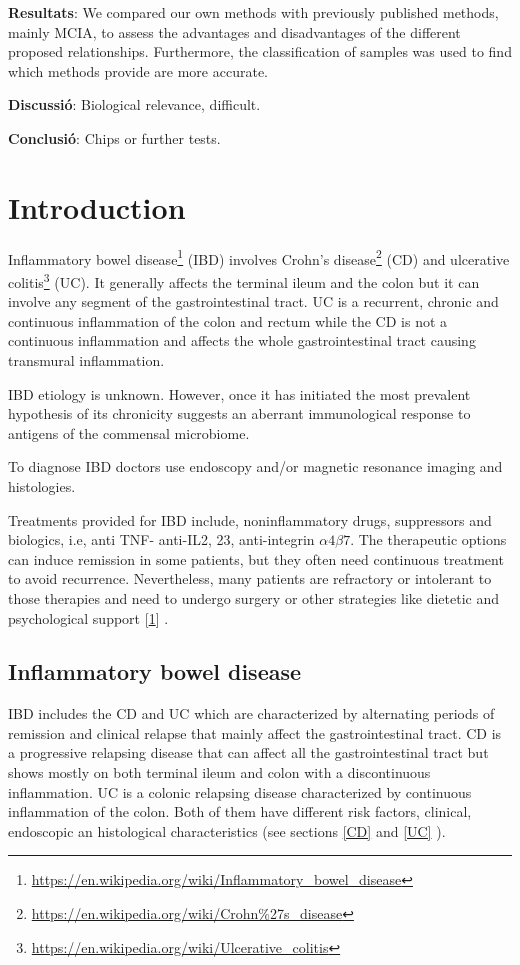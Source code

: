 \documentclass[
  a4paper,
]{book}
\DeclareRobustCommand{\href}[2]{#2\footnote{\url{#1}}}
\begin{document}
\textbf{Resultats}: We compared our own methods with previously published methods, mainly MCIA, to assess the advantages and disadvantages of the different proposed relationships.
Furthermore, the classification of samples was used to find which methods provide are more accurate.

\textbf{Discussió}: Biological relevance, difficult.

\textbf{Conclusió}: Chips or further tests.

\hypertarget{introduction}{%
\chapter{Introduction}\label{introduction}}

\href{https://en.wikipedia.org/wiki/Inflammatory_bowel_disease}{Inflammatory bowel disease} (IBD) involves \href{https://en.wikipedia.org/wiki/Crohn\%27s_disease}{Crohn's disease} (CD) and \href{https://en.wikipedia.org/wiki/Ulcerative_colitis}{ulcerative colitis} (UC).
It generally affects the terminal ileum and the colon but it can involve any segment of the gastrointestinal tract.
UC is a recurrent, chronic and continuous inflammation of the colon and rectum while the CD is not a continuous inflammation and affects the whole gastrointestinal tract causing transmural inflammation.

IBD etiology is unknown.
However, once it has initiated the most prevalent hypothesis of its chronicity suggests an aberrant immunological response to antigens of the commensal microbiome.

To diagnose IBD doctors use endoscopy and/or magnetic resonance imaging and histologies.

Treatments provided for IBD include, noninflammatory drugs, suppressors and biologics, i.e, anti TNF- anti-IL2, 23, anti-integrin \(\alpha4\beta7\).
The therapeutic options can induce remission in some patients, but they often need continuous treatment to avoid recurrence.
Nevertheless, many patients are refractory or intolerant to those therapies and need to undergo surgery or other strategies like dietetic and psychological support {[}\protect\hyperlink{ref-raine2021}{1}{]} .

\hypertarget{IBD}{%
\section{Inflammatory bowel disease}\label{IBD}}

IBD includes the CD and UC which are characterized by alternating periods of remission and clinical relapse that mainly affect the gastrointestinal tract.
CD is a progressive relapsing disease that can affect all the gastrointestinal tract but shows mostly on both terminal ileum and colon with a discontinuous inflammation.
UC is a colonic relapsing disease characterized by continuous inflammation of the colon.
Both of them have different risk factors, clinical, endoscopic an histological characteristics (see sections \ref{CD} and \ref{UC} ).
\end{document}
